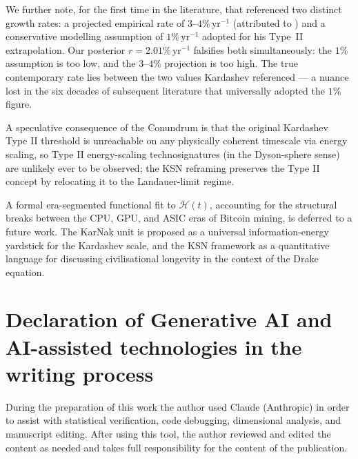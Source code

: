 \documentclass[final,5p,times,twocolumn,authoryear]{elsarticle}
\begin{document}
We further note, for the first time in the literature, that
\citet{kar64} referenced two distinct growth rates: a
projected empirical rate of $3$--$4\%\,\mathrm{yr}^{-1}$
(attributed to \citealt{Putnam1948}) and a conservative
modelling assumption of $1\%\,\mathrm{yr}^{-1}$ adopted
for his Type~II extrapolation. Our posterior
$r = 2.01\%\,\mathrm{yr}^{-1}$ falsifies both simultaneously:
the $1\%$ assumption is too low, and the $3$--$4\%$
projection is too high. The true contemporary rate lies
between the two values Kardashev referenced --- a nuance
lost in the six decades of subsequent literature that
universally adopted the $1\%$ figure.

A speculative consequence of the Conundrum is that the original Kardashev Type II 
threshold is unreachable on any physically coherent timescale via energy 
scaling, so Type II energy-scaling technosignatures (in the Dyson-sphere 
sense) are unlikely ever to be observed; the KSN reframing preserves 
the Type II concept by relocating it to the Landauer-limit regime.
 
A formal era-segmented functional fit to $\mathcal{H}(t)$, accounting
for the structural breaks between the CPU, GPU, and ASIC
eras of Bitcoin mining, is deferred to a future work. The
KarNak unit is proposed as a universal information-energy
yardstick for the Kardashev scale, and the KSN framework
as a quantitative language for discussing civilisational
longevity in the context of the Drake equation.
 

\section*{Declaration of Generative AI and AI-assisted technologies in the writing process}
During the preparation of this work the author used Claude (Anthropic) in order to
assist with statistical verification, code debugging, dimensional analysis, and
manuscript editing. After using this tool, the author reviewed and edited the
content as needed and takes full responsibility for the content of the publication.

\end{document}
